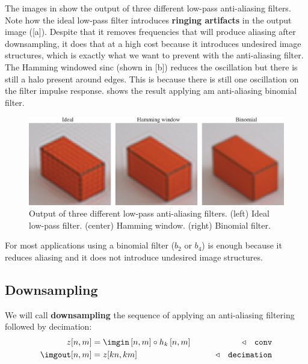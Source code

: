The images in \fig{\ref{fig:ringing_artifacts}} show the output of three different low-pass anti-aliasing filters. Note how the ideal low-pass filter introduces {\bf ringing artifacts} in the output image (\fig{\ref{fig:ringing_artifacts}}[a]). Despite that it removes frequencies that will produce aliasing after downsampling, it does that at a high cost because it introduces undesired image structures, which is exactly what we want to prevent with the anti-aliasing filter. The Hamming windowed sinc (shown in \fig{\ref{fig:ringing_artifacts}}[b]) reduces the oscillation but there is still a halo present around edges. This is because there is still one oscillation on the filter impulse response.  shows the result applying am anti-aliasing binomial filter.

\begin{figure}[h!]
\centerline{
\includegraphics[width=1\linewidth]{figures/upsamplig_downsampling/ringing_artifacts.eps}
}
\caption{Output of three different low-pass anti-aliasing filters. (left) Ideal low-pass filter. (center) Hamming window. (right) Binomial filter.}
\label{fig:ringing_artifacts}
\end{figure}

For most applications using a binomial filter ($b_2$ or $b_4$) is enough because it reduces aliasing and it does not introduce undesired image structures. 

\subsection{Downsampling}

We will call {\bf downsampling} the sequence of applying an anti-aliasing filtering followed by decimation:
\begin{align}
    z[n,m] &= \imgin \left[n,m\right] \circ h_k \left[ n,m \right]  & \quad\quad \triangleleft \quad \texttt{conv}\\
    \imgout [n,m] &= z[kn,km]  & \quad\quad \triangleleft \quad \texttt{decimation}
\end{align}

